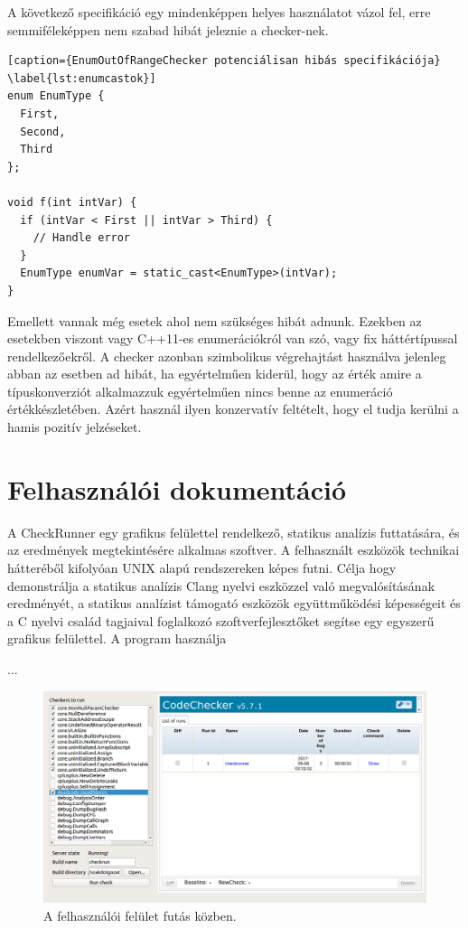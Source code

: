 \documentclass[a4paper,12pt]{report}
\begin{document}
A következő specifikáció egy mindenképpen helyes használatot vázol fel, erre semmiféleképpen nem szabad hibát jeleznie a checker-nek.

\begin{lstlisting}[caption={EnumOutOfRangeChecker potenciálisan hibás specifikációja}
\label{lst:enumcastok}]
enum EnumType {
  First,
  Second,
  Third
};
 
void f(int intVar) {
  if (intVar < First || intVar > Third) {
    // Handle error
  }
  EnumType enumVar = static_cast<EnumType>(intVar);
}
\end{lstlisting}

Emellett vannak még esetek ahol nem szükséges hibát adnunk. Ezekben az esetekben viszont vagy C++11-es enumerációkról van szó, vagy fix háttértípussal rendelkezőekről. A checker azonban szimbolikus végrehajtást használva jelenleg abban az esetben ad hibát, ha egyértelműen kiderül, hogy az érték amire a típuskonverziót alkalmazzuk egyértelműen nincs benne az enumeráció értékkészletében. Azért használ ilyen konzervatív feltételt, hogy el tudja kerülni a hamis pozitív jelzéseket.

\chapter{Felhasználói dokumentáció}
A CheckRunner egy grafikus felülettel rendelkező, statikus analízis futtatására, és az eredmények megtekintésére alkalmas szoftver. A felhasznált eszközök technikai hátteréből kifolyóan UNIX alapú rendszereken képes futni. Célja hogy demonstrálja a statikus analízis Clang nyelvi eszközzel való megvalósításának eredményét, a statikus analízist támogató eszközök együttműködési képességeit és a C nyelvi család tagjaival foglalkozó szoftverfejlesztőket segítse egy egyszerű grafikus felülettel.
A program használja


...

\begin{figure}[h]
\caption{A felhasználói felület futás közben.}
\centering
\includegraphics[scale=0.36]{ui.png}
\end{figure}
\end{document}
